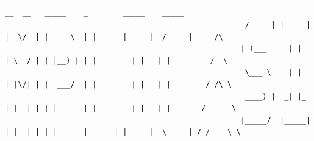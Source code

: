 \documentclass[openany]{book}  %
\begin{document}
\begin{titlepage}
{\begin{verbatim}
                                                                                                                                                 
                                                                                                                                                 
                                                                                                                                                 
                                                                                                                                                 
                                                                                                                                                 
                                                                                                                                                                                                                                                                                      
                                                                                                                                                                                                                                                                            
                                                                                                                                                                                                                                                                            
                                                        _____   _____   __  __   _____    _        _____    _____            
                                                       / ____| |_   _| |  \/  | |  __ \  | |      |_   _|  / ____|     /\    
                                                      | (___     | |   | \  / | | |__) | | |        | |   | |         /  \   
                                                       \___ \    | |   | |\/| | |  ___/  | |        | |   | |        / /\ \  
                                                       ____) |  _| |_  | |  | | | |      | |____   _| |_  | |____   / ____ \ 
                                                      |_____/  |_____| |_|  |_| |_|      |______| |_____|  \_____| /_/    \_\
                                                                                            
                                                                                                                                                                                                              
                                                                                                                                                              

\end{verbatim}}
\end{titlepage}
\end{document}
